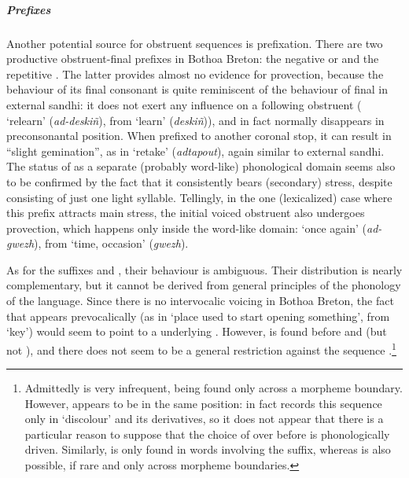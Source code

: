 \subparagraph{Prefixes}
\label{sec:prefixes}

Another potential source for obstruent sequences is prefixation. There are two productive obstruent-final prefixes in Bothoa Breton: the negative  or  and the repetitive . The latter provides almost no evidence for provection, because the behaviour of its final consonant is quite reminiscent of the behaviour of final \ipa{[d]} in external sandhi: it does not exert any influence on a following obstruent (\ipa{[ˌhaˈdesko]} `relearn' (\emph{ad-deskiñ}), from \ipa{[ˈdesko]} `learn' (\emph{deskiñ})), and in fact normally disappears in preconsonantal position. When prefixed to another coronal stop, it can result in \enquote{slight gemination}, as in  `retake' (\emph{adtapout}), again similar to external sandhi. The status of   as a separate (probably word-like) phonological domain seems also to be confirmed by the fact that it consistently bears (secondary) stress, despite consisting of just one light syllable. Tellingly, in the one (lexicalized) case where this prefix attracts main stress, the initial voiced obstruent also undergoes provection, which happens only inside the word-like domain: \ipa{[ˈhaʧəz̥]} `once again' (\emph{ad-gwezh}), from \ipa{[ˈdʒøz̥]} `time, occasion' (\emph{gwezh}).

As for the suffixes  and , their behaviour is ambiguous. Their distribution is nearly complementary, but it cannot be derived from general principles of the phonology of the language. Since there is no intervocalic voicing in Bothoa Breton, the fact that  appears prevocalically (as in \ipa{[ˌdiˈzalve]} `place used to start opening something', from \ipa{[ˈalve]} `key') would seem to point to a underlying . However,  is found before \ipa{[l]} and \ipa{[m]} (but not \ipa{[r]}), and there does not seem to be a general restriction against the sequence \ipa{[zl]}.\footnote{Admittedly \ipa{[zl]} is very infrequent, being found only across a morpheme boundary. However, \ipa{[sl]} appears to be in the same position: in fact \citet{humphreys95:_phonol_bothoa_saint_nicol_pelem} records this sequence only in \ipa{[ˌdisˈliːvo]} `discolour' and its derivatives, so it does not appear that there is a particular reason to suppose that the choice of \ipa{[dis]} over \ipa{[diz]} before \ipa{[l]} is phonologically driven. Similarly, \ipa{[sm]} is only found in words involving the \ipa{[dis]} suffix, whereas \ipa{[zm]} is also possible, if rare and only across morpheme boundaries.}

